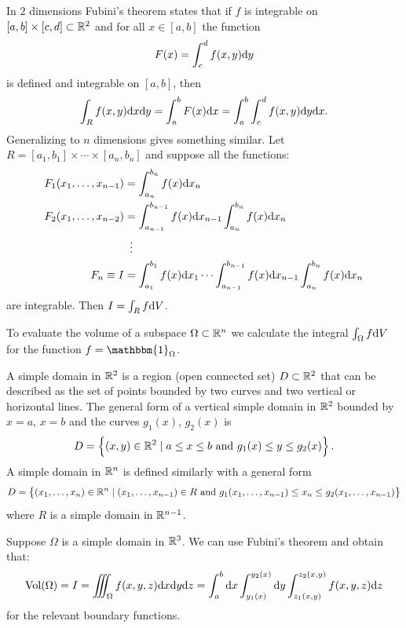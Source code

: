 \documentclass[11pt,a4paper]{article}
\begin{document}
\begin{theorem}
  In $2$ dimensions Fubini's theorem states that if $f$ is integrable
  on $[a,b] \times [c,d] \subset \mathbb{R}^2$ and for all $x \in [a,b]$ the function
  \[
    F(x) = \int_{c}^{d} f(x,y) \dy
  \]
  is defined and integrable on $[a,b]$, then
  \[
    \int_{R} f(x,y) \dx \dy =
    \int_{a}^{b} F(x) \dx =
    \int_{a}^{b} \int_{c}^{d} f(x,y) \dy \dx.
  \]
  Generalizing to $n$ dimensions gives something similar.
  Let $R = [a_1,b_1] \times \cdots \times [a_n,b_n]$ and suppose
  all the functions:
  \begin{align*}
    F_1(x_1,\dots,x_{n-1}) &= \int_{a_n}^{b_n}{f(x) \dx_n} \\
    F_2(x_1,\dots,x_{n-2}) 
    &= \int_{a_{n-1}}^{b_{n-1}}{f(x) \dx_{n-1}}
    \int_{a_n}^{b_n}{f(x) \dx_n}\\
    &\vdotswithin{=} \\
    F_n \equiv I &= \int_{a_{1}}^{b_{1}}{f(x) \dx_{1}} \cdots
    \int_{a_{n-1}}^{b_{n-1}}{f(x) \dx_{n-1}}
    \int_{a_n}^{b_n}{f(x) \dx_n} \\
  \end{align*}
  are integrable.
  Then $I = \int_{R}{f \mathrm{d} V}$.
\end{theorem}

\begin{remark}
  To evaluate the volume of a subspace $\Omega \subset \mathbb{R}^n$ we calculate
  the integral $\int_{\Omega}{f \mathrm{d} V}$ for the function
  $f = \mathbbm{1}_{\Omega}$.
\end{remark}

\begin{definition}
  A simple domain in $\mathbb{R}^2$ is a region (open connected set)
  $D \subset \mathbb{R}^2$ that can be
  described as the set of points bounded by two curves and two
  vertical or horizontal lines.
  The general form of a vertical simple domain in $\mathbb{R}^2$ bounded by
  $x = a$, $x = b$ and the curves $g_1(x)$, $g_2(x)$ is
  \[
    D = \left\{(x,y) \in \mathbb{R}^2 \mid a \le x \le b \text{ and } g_1(x) \le y \le g_2(x)\right\}.
  \]
  A simple domain in $\mathbb{R}^n$ is defined similarly with a general form
  \[
    D =
    \left\{(x_1,\dots,x_n) \in \mathbb{R}^n \mid 
    (x_1,\dots,x_{n-1}) \in R
    \text{ and } g_1(x_1,\dots,x_{n-1}) \le x_n \le g_2(x_1,\dots,x_{n-1})\right\}
  \]
  where $R$ is a simple domain in $\mathbb{R}^{n-1}$.
\end{definition}

\begin{remark}
  Suppose $\Omega$ is a simple domain in $\mathbb{R}^3$.
  We can use Fubini's theorem and obtain that:
  \[
    \Vol(\Omega) =
    I = \iiint_{\Omega}{f(x,y,z)\dx\dy\dz}
      = \int_{a}^{b}{\dx}
        \int_{y_1(x)}^{y_2(x)}{\dy}
        \int_{z_1(x,y)}^{z_2(x,y)}{f(x,y,z)\dz}
  \]
  for the relevant boundary functions.
\end{remark}
\end{document}
